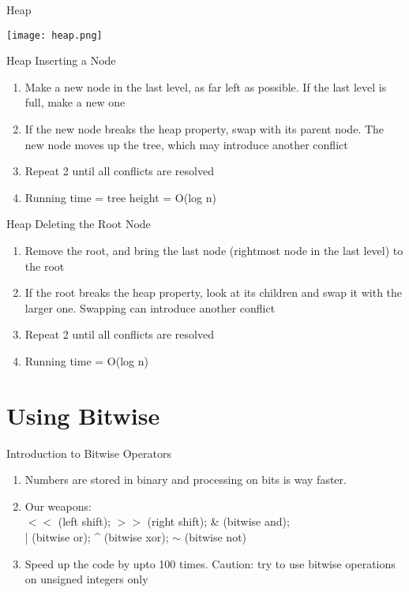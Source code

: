 \documentclass{beamer}
\begin{document}
\begin{frame}[<+->]{Heap}
\begin{block}{}
  \texttt{[image: heap.png]}
\end{block}
\end{frame}

\begin{frame}[<+->]{Heap}
Inserting a Node
  \begin{enumerate}
    \item Make a new node in the last level, as far left as possible. If the last level is full, make a new one
    \item If the new node breaks the heap property, swap with its parent node. The new node moves up the tree, which may introduce another conflict
    \item Repeat 2 until all conflicts are resolved
    \item \alert{Running time = tree height = O(log n)}
  \end{enumerate}
\end{frame}

\begin{frame}[<+->]{Heap}
Deleting the Root Node
  \begin{enumerate}
    \item Remove the root, and bring the last node (rightmost node in the last level) to the root
    \item If the root breaks the heap property, look at its children and swap it with the larger one. Swapping can introduce another conflict
    \item Repeat 2 until all conflicts are resolved
    \item \alert{Running time = O(log n)}
  \end{enumerate}
\end{frame}

\section{Using Bitwise}
\begin{frame}[<+->]{Introduction to Bitwise Operators}
\begin{enumerate}
  \item Numbers are stored in binary and processing on bits is way faster.
  \item Our weapons:\\
    $<<$ (left shift); $>>$ (right shift); \& (bitwise and);\\
    | (bitwise or); \^{} (bitwise xor); $\sim$ (bitwise not)
  \item Speed up the code by upto 100 times. \alert{Caution: try to use
    bitwise operations on unsigned integers only}
\end{enumerate}
\end{frame}
\end{document}
